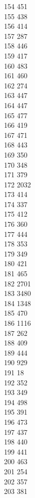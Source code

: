 { 154	451 \\
 155	438 \\
 156	414 \\
 157	287 \\
 158	446 \\
 159	417 \\
 160	483 \\
 161	460 \\
 162	274 \\
 163	447 \\
 164	447 \\
 165	477 \\
 166	419 \\
 167	471 \\
 168	443 \\
 169	350 \\
 170	348 \\
 171	379 \\
 172	2032 \\
 173	414 \\
 174	337 \\
 175	412 \\
 176	360 \\
 177	444 \\
 178	353 \\
 179	349 \\
 180	421 \\
 181	465 \\
 182	2701 \\
 183	3480 \\
 184	1348 \\
 185	470 \\
 186	1116 \\
 187	262 \\
 188	409 \\
 189	444 \\
 190	929 \\
 191	18 \\
 192	352 \\
 193	349 \\
 194	498 \\
 195	391 \\
 196	473 \\
 197	437 \\
 198	440 \\
 199	441 \\
 200	463 \\
 201	254 \\
 202	357 \\
 203	381 \\
}
